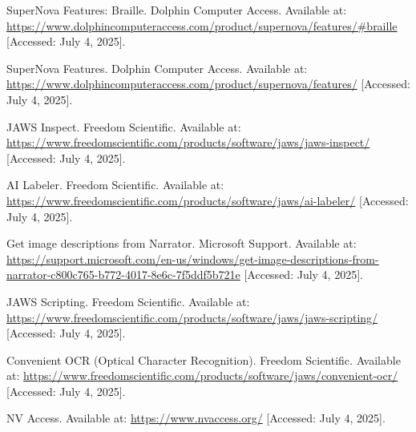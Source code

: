 \begin{thebibliography}{99}
 SuperNova Features: Braille. Dolphin Computer Access. Available at: \url{https://www.dolphincomputeraccess.com/product/supernova/features/#braille} [Accessed: July 4, 2025].

 SuperNova Features. Dolphin Computer Access. Available at: \url{https://www.dolphincomputeraccess.com/product/supernova/features/} [Accessed: July 4, 2025].

 JAWS Inspect. Freedom Scientific. Available at: \url{https://www.freedomscientific.com/products/software/jaws/jaws-inspect/} [Accessed: July 4, 2025].

 AI Labeler. Freedom Scientific. Available at: \url{https://www.freedomscientific.com/products/software/jaws/ai-labeler/} [Accessed: July 4, 2025].

 Get image descriptions from Narrator. Microsoft Support. Available at: \url{https://support.microsoft.com/en-us/windows/get-image-descriptions-from-narrator-c800c765-b772-4017-8e6c-7f5ddf5b721e} [Accessed: July 4, 2025].

 JAWS Scripting. Freedom Scientific. Available at: \url{https://www.freedomscientific.com/products/software/jaws/jaws-scripting/} [Accessed: July 4, 2025].

 Convenient OCR (Optical Character Recognition). Freedom Scientific. Available at: \url{https://www.freedomscientific.com/products/software/jaws/convenient-ocr/} [Accessed: July 4, 2025].

 NV Access. Available at: \url{https://www.nvaccess.org/} [Accessed: July 4, 2025].

\end{thebibliography}
